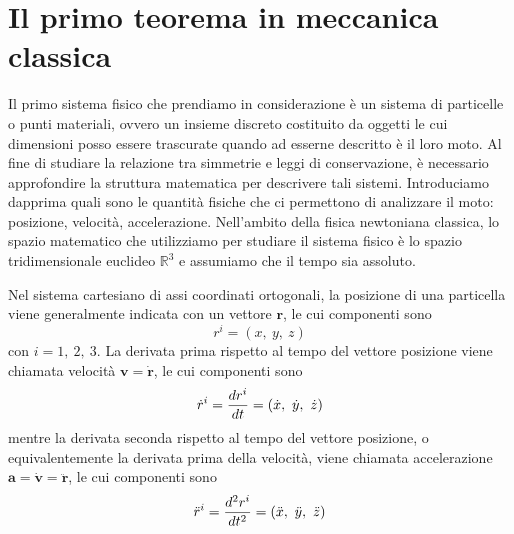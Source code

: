 \chapter{Il primo teorema in meccanica classica}
    
    Il primo sistema fisico che prendiamo in considerazione è un sistema di particelle o punti materiali, ovvero un insieme discreto costituito da oggetti le cui dimensioni posso essere trascurate quando ad esserne descritto è il loro moto. Al fine di studiare la relazione tra simmetrie e leggi di conservazione, è necessario approfondire la struttura matematica per descrivere tali sistemi. Introduciamo dapprima quali sono le quantità fisiche che ci permettono di analizzare il moto: posizione, velocità, accelerazione. Nell'ambito della fisica newtoniana classica, lo spazio matematico che utilizziamo per studiare il sistema fisico è lo spazio tridimensionale euclideo $\mathbb R^3$ e assumiamo che il tempo sia assoluto.
    
    Nel sistema cartesiano di assi coordinati ortogonali, la posizione di una particella viene generalmente indicata con un vettore $\mathbf r$, le cui componenti sono 
    \begin{equation*}
        r^i = (x, ~y, ~z)
    \end{equation*}
    con $i = 1, ~2, ~3$. La derivata prima rispetto al tempo del vettore posizione viene chiamata velocità $\mathbf v = \mathbf {\dot r}$, le cui componenti sono 
    \begin{equation*}
        \dot r^i = \frac{dr^i}{dt} = (\dot x, ~\dot y, ~\dot z)
    \end{equation*}
    mentre la derivata seconda rispetto al tempo del vettore posizione, o equivalentemente la derivata prima della velocità, viene chiamata accelerazione $\mathbf a = \mathbf{\dot v} = \mathbf{\ddot r}$, le cui componenti sono 
    \begin{equation*}
        \ddot r^i = \frac{d^2r^i}{dt^2} = (\ddot x, ~\ddot y, ~\ddot z)
    \end{equation*}
    
